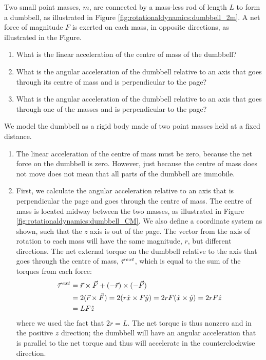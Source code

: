 \begin{example}{ Two small point masses, $m$, are connected by a mass-less rod of length $L$ to form a dumbbell, as illustrated in Figure \ref{fig:rotationaldynamics:dumbbell_2m}. A net force of magnitude $F$ is exerted on each mass, in opposite directions, as illustrated in the Figure. 
\begin{enumerate}[label=\alph*),topsep=-10pt]
\item What is the linear acceleration of the centre of mass of the dumbbell?
\item What is the angular acceleration of the dumbbell relative to an axis that goes through its centre of mass and is perpendicular to the page?
\item What is the angular acceleration of the dumbbell relative to an axis that goes through one of the masses and is perpendicular to the page? 
\end{enumerate}}

We model the dumbbell as a rigid body made of two point masses held at a fixed distance.
\begin{enumerate}[label=\alph*),topsep=-10pt]
\item The linear acceleration of the centre of mass must be zero, because the net force on the dumbbell is zero. However, just because the centre of mass does not move does not mean that all parts of the dumbbell are immobile.

\item First, we calculate the angular acceleration relative to an axis that is perpendicular the page and goes through the centre of mass. The centre of mass is located midway between the two masses, as illustrated in Figure \ref{fig:rotationaldynamics:dumbbell_CM}. We also define a coordinate system as shown, such that the $z$ axis is out of the page.
The vector from the axis of rotation to each mass will have the same magnitude, $r$, but different directions. The net external torque on the dumbbell relative to the axis that goes through the centre of mass, $\pvec\tau^{ext}$, which is equal to the sum of the torques from each force:
\begin{align*}
\pvec\tau^{ext}&= \vec r \times \vec F + (-\vec r) \times (-\vec F) \\
&= 2 (\vec r \times \vec F)=2 (r\hat x \times F\hat y) = 2rF (\hat x \times \hat y)=2rF\hat z\\
&=LF\hat z
\end{align*}
where we used the fact that $2r = L$. The net torque is thus nonzero and in the positive $z$ direction; the dumbbell will have an angular acceleration that is parallel to the net torque and thus will accelerate in the counterclockwise direction.


\end{enumerate}
\end{example}
